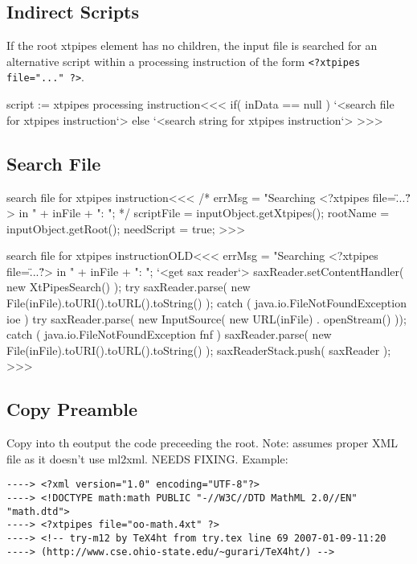 \documentclass{article}
\begin{document}
{%
\subsection{Indirect Scripts}



If the root xtpipes element has no children, the input file is
searched for an alternative script within a processing instruction of
the form \verb+<?xtpipes file="..." ?>+.

\<script := xtpipes processing instruction\><<<
if( inData == null ){
   `<search file for xtpipes instruction`>
} else {
   `<search string for xtpipes instruction`>
}
>>>


\subsection{Search File}




\<search file for xtpipes instruction\><<<
/*
errMsg = "Searching <?xtpipes file=\"...\"?>  in "
                      + inFile + ": ";
*/
scriptFile = inputObject.getXtpipes();
rootName = inputObject.getRoot();
needScript = true;
>>>

\<search file for xtpipes instructionOLD\><<<
errMsg = "Searching <?xtpipes file=\"...\"?>  in "
                      + inFile + ": ";
       `<get sax reader`>
       saxReader.setContentHandler( new XtPipesSearch() );
try{
    saxReader.parse( new File(inFile).toURI().toURL().toString() );
} catch ( java.io.FileNotFoundException ioe ){
    try{
       saxReader.parse( new InputSource(
                        new URL(inFile) . openStream() ));
    } catch ( java.io.FileNotFoundException fnf ){
        saxReader.parse( new File(inFile).toURI().toURL().toString() );
}   }
       saxReaderStack.push( saxReader );
>>>

\subsection{Copy Preamble}


Copy into th eoutput the code preceeding the root. Note: assumes proper
XML file as it doesn't use ml2xml. NEEDS FIXING.
Example:

\begin{verbatim}
----> <?xml version="1.0" encoding="UTF-8"?>
----> <!DOCTYPE math:math PUBLIC "-//W3C//DTD MathML 2.0//EN" "math.dtd">
----> <?xtpipes file="oo-math.4xt" ?>
----> <!-- try-m12 by TeX4ht from try.tex line 69 2007-01-09-11:20
----> (http://www.cse.ohio-state.edu/~gurari/TeX4ht/) -->
\end{verbatim}



}
\end{document}
